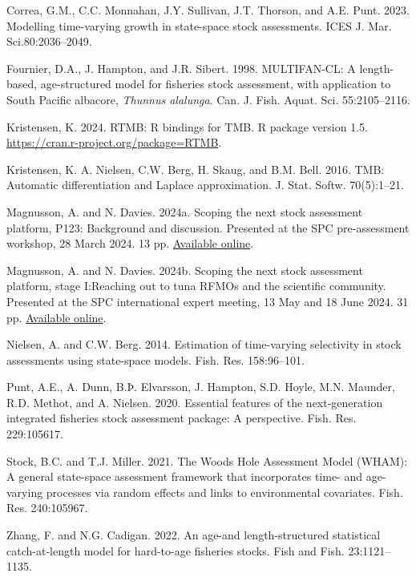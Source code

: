 \documentclass{SCreport}
\newcommand\github
{https://github.com/PacificCommunity/ofp-sam-transition-plan/blob/main}
\newcommand\present{\github/presentations}
\begin{document}
\begin{description}\setlength\itemsep{0ex}
  \item Correa, G.M., C.C. Monnahan, J.Y. Sullivan, J.T. Thorson, and A.E. Punt.
  2023. Modelling time-varying growth in state-space stock assessments. ICES J.
  Mar. Sci.80:2036--2049.
  \item Fournier, D.A., J. Hampton, and J.R. Sibert. 1998. MULTIFAN-CL: A
  length-based, age-structured model for fisheries stock assessment, with
  application to South Pacific albacore, \textit{Thunnus alalunga}. Can. J.
  Fish. Aquat. Sci. 55:2105--2116.
  \item Kristensen, K. 2024. RTMB: R bindings for TMB. R package version 1.5.\\
  \href{https://cran.r-project.org/package=RTMB}
  {https://cran.r-project.org/package=RTMB}.
  \item Kristensen, K. A. Nielsen, C.W. Berg, H. Skaug, and B.M. Bell. 2016.
  TMB: Automatic differentiation and Laplace approximation. J. Stat. Softw.
  70(5):1--21.
  \item Magnusson, A. and N. Davies. 2024a. Scoping the next stock assessment
  platform, P123: Background and discussion. Presented at the SPC pre-assessment
  workshop, 28 March 2024. 13 pp.
  \href{\present/2024_03_28_paw_scoping/2024_03_28_paw_scoping.pdf}
  {Available online}.
  \item Magnusson, A. and N. Davies. 2024b. Scoping the next stock assessment
  platform, stage I:\linebreak Reaching out to tuna RFMOs and the scientific
  community. Presented at the SPC international expert meeting, 13 May and 18
  June 2024. 31 pp.
  \href{\present/2024_05_13_experts_scoping/2024_05_13_experts_scoping.pdf}
  {Available online}.
  \item Nielsen, A. and C.W. Berg. 2014. Estimation of time-varying selectivity
  in stock assessments using state-space models. Fish. Res. 158:96--101.
  \item Punt, A.E., A. Dunn, B.Þ. Elvarsson, J. Hampton, S.D. Hoyle, M.N.
  Maunder, R.D. Methot, and A. Nielsen. 2020. Essential features of the
  next-generation integrated fisheries stock assessment package: A perspective.
  Fish. Res. 229:105617.
  \item Stock, B.C. and T.J. Miller. 2021. The Woods Hole Assessment Model
  (WHAM): A general state-space assessment framework that incorporates time- and
  age-varying processes via random effects and links to environmental
  covariates. Fish. Res. 240:105967.
  \item Zhang, F. and N.G. Cadigan. 2022. An age-and length-structured
  statistical catch-at-length model for hard-to-age fisheries stocks. Fish and
  Fish. 23:1121--1135.
\end{description}
\end{document}
